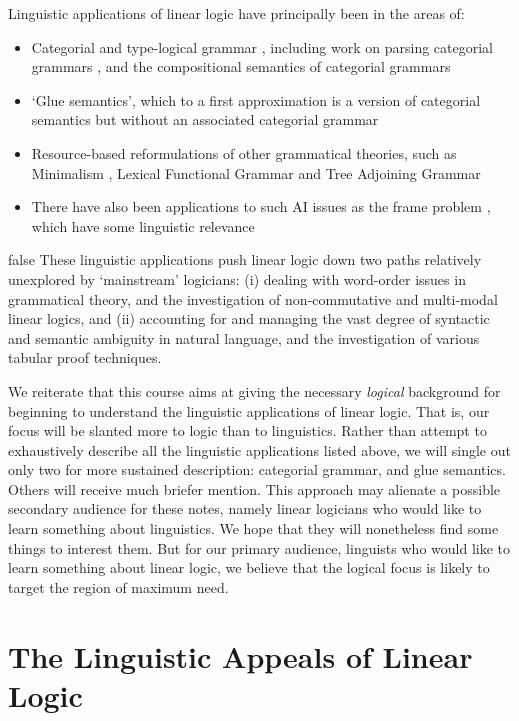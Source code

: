 Linguistic applications of linear logic have principally been in the
areas of:
\begin{itemize}
\item Categorial and type-logical grammar \cite{Moortgat,vanBenthem},
including work on parsing categorial grammars \cite{Morrill,Hepple}, and the 
compositional semantics of categorial grammars \cite{Morrill,Carpenter}
\item `Glue semantics', which to a first approximation is a version of
categorial semantics but without an associated categorial grammar
\cite{Dalrymple}
\item Resource-based reformulations of other grammatical theories,
such as
Minimalism , Lexical Functional Grammar 
\cite{Saraswat,Muskens}
and Tree Adjoining Grammar \cite{Abrusci}
\item There have also been applications to such AI issues as the frame 
problem \cite{White}, which have some linguistic relevance
\end{itemize}
\if false
These linguistic applications push linear logic down two paths
relatively unexplored by `mainstream' logicians: (i) dealing with
word-order issues in grammatical theory, and the investigation of
non-commutative and multi-modal linear logics, and (ii) accounting for
and managing the vast degree of syntactic and semantic ambiguity in
natural language, and the investigation of various tabular proof
techniques.
\fi


We reiterate that this course aims at giving the necessary {\em
logical} background for beginning to understand the linguistic
applications of linear logic.  That is, our focus will be slanted
more to logic than to linguistics.  Rather than attempt to
exhaustively describe all the linguistic applications listed above,
we will single out only two for more sustained description: categorial
grammar, and glue semantics.  Others will receive much
briefer mention.  This approach may alienate a possible secondary
audience for these notes, namely linear logicians who would like
to learn something about linguistics.  We hope that they will
nonetheless find some things to interest them.  But for our primary
audience, linguists who would like to learn something about linear
logic, we believe that the logical focus is likely to target the
region of maximum need.

\section{The Linguistic Appeals of Linear Logic}

